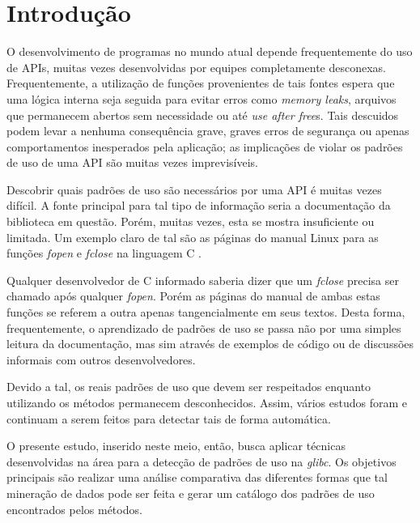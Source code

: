 \section{Introdução}
O desenvolvimento de programas no mundo atual depende frequentemente do uso de
APIs, muitas vezes desenvolvidas por equipes completamente desconexas.
Frequentemente, a utilização de funções provenientes de tais fontes espera que
uma lógica interna seja seguida para evitar erros como \textit{memory leaks}, 
arquivos que permanecem abertos sem necessidade ou até \textit{use after free}s.
Tais descuidos podem levar a nenhuma consequência grave, graves erros de
segurança ou apenas comportamentos inesperados pela aplicação; as implicações de
violar os padrões de uso de uma API são muitas vezes imprevisíveis.

Descobrir quais padrões de uso são necessários por uma API é muitas vezes
difícil. A fonte principal para tal tipo de informação seria a documentação da
biblioteca em questão. Porém, muitas vezes, esta se mostra insuficiente ou
limitada. Um exemplo claro de tal são as páginas do manual Linux para as funções
\textit{fopen} e \textit{fclose} na linguagem C \cite{man_fopen}
\cite{man_fclose}.

Qualquer desenvolvedor de C informado saberia dizer que um \textit{fclose}
precisa ser chamado após qualquer \textit{fopen}. Porém as páginas do manual de
ambas estas funções se referem a outra apenas tangencialmente em seus textos.
Desta forma, frequentemente, o aprendizado de padrões de uso se passa não por
uma simples leitura da documentação, mas sim através de exemplos de código ou de
discussões informais com outros desenvolvedores.

Devido a tal, os reais padrões de uso que devem ser respeitados enquanto
utilizando os métodos permanecem desconhecidos. Assim, vários estudos foram e
continuam a serem feitos para detectar tais de forma automática.

O presente estudo, inserido neste meio, então, busca aplicar técnicas
desenvolvidas na área para a detecção de padrões de uso na \textit{glibc}. Os
objetivos principais são realizar uma análise comparativa das diferentes formas
que tal mineração de dados pode ser feita e gerar um catálogo dos padrões de uso
encontrados pelos métodos.
